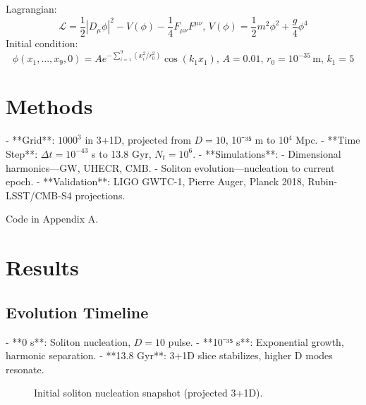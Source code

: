 \documentclass[11pt]{article}
\begin{document}
Lagrangian:
\begin{equation}
\mathcal{L} = \frac{1}{2} |D_\mu \phi|^2 - V(\phi) - \frac{1}{4} F_{\mu \nu} F^{\mu \nu}, \, V(\phi) = \frac{1}{2} m^2 \phi^2 + \frac{g}{4} \phi^4
\end{equation}
Initial condition:
\begin{equation}
\phi(x_1, ..., x_9, 0) = A e^{-\sum_{i=1}^{9} (x_i^2 / r_0^2)} \cos(k_1 x_1), \, A = 0.01, \, r_0 = 10^{-35} \, \text{m}, \, k_1 = 5
\end{equation}

\section{Methods}
- **Grid**: \(1000^3\) in 3+1D, projected from \(D = 10\), 10⁻³⁵ m to 10$^4$ Mpc.
- **Time Step**: \(\Delta t = 10^{-43}\) s to 13.8 Gyr, \(N_t = 10^6\).
- **Simulations**: 
  - Dimensional harmonics—GW, UHECR, CMB.
  - Soliton evolution—nucleation to current epoch.
- **Validation**: LIGO GWTC-1, Pierre Auger, Planck 2018, Rubin-LSST/CMB-S4 projections.

Code in Appendix A.

\section{Results}
\subsection{Evolution Timeline}
- **0 s**: Soliton nucleation, \(D = 10\) pulse.
- **10⁻³⁵ s**: Exponential growth, harmonic separation.
- **13.8 Gyr**: 3+1D slice stabilizes, higher D modes resonate.

\begin{figure}[h]
    \centering
    \caption{Initial soliton nucleation snapshot (projected 3+1D).}
    \label{fig:nucleation}
\end{figure}
\end{document}
